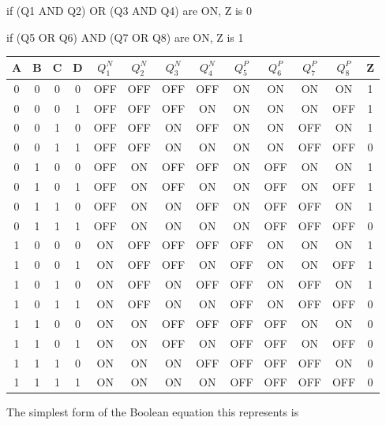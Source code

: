 \documentclass{article}
\begin{document}
\begin{center}
    if (Q1 AND Q2) OR (Q3 AND Q4) are ON, Z is 0
    
    if (Q5 OR Q6) AND (Q7 OR Q8) are ON, Z is 1
    
    \vspace{3mm}
    
    \begin{tabular}{c|c|c|c|c|c|c|c|c|c|c|c|c}
        A & B & C & D & $Q_1^N$ & $Q_2^N$ & $Q_3^N$ & $Q_4^N$ & $Q_5^P$ & $Q_6^P$ & $Q_7^P$ & $Q_8^P$ & Z\\ 
        \hline
         0 & 0 & 0 & 0 & OFF & OFF & OFF & OFF & ON  & ON  & ON  & ON  & 1\\
         0 & 0 & 0 & 1 & OFF & OFF & OFF & ON  & ON  & ON  & ON  & OFF & 1\\
         0 & 0 & 1 & 0 & OFF & OFF & ON  & OFF & ON  & ON  & OFF & ON  & 1\\
         0 & 0 & 1 & 1 & OFF & OFF & ON  & ON  & ON  & ON  & OFF & OFF & 0\\
         0 & 1 & 0 & 0 & OFF & ON  & OFF & OFF & ON  & OFF & ON  & ON  & 1\\
         0 & 1 & 0 & 1 & OFF & ON  & OFF & ON  & ON  & OFF & ON  & OFF & 1\\
         0 & 1 & 1 & 0 & OFF & ON  & ON  & OFF & ON  & OFF & OFF & ON  & 1\\
         0 & 1 & 1 & 1 & OFF & ON  & ON  & ON  & ON  & OFF & OFF & OFF & 0\\
         1 & 0 & 0 & 0 & ON  & OFF & OFF & OFF & OFF & ON  & ON  & ON  & 1\\
         1 & 0 & 0 & 1 & ON  & OFF & OFF & ON  & OFF & ON  & ON  & OFF & 1\\
         1 & 0 & 1 & 0 & ON  & OFF & ON  & OFF & OFF & ON  & OFF & ON  & 1\\
         1 & 0 & 1 & 1 & ON  & OFF & ON  & ON  & OFF & ON  & OFF & OFF & 0\\
         1 & 1 & 0 & 0 & ON  & ON  & OFF & OFF & OFF & OFF & ON  & ON  & 0\\ 
         1 & 1 & 0 & 1 & ON  & ON  & OFF & ON  & OFF & OFF & ON  & OFF & 0\\
         1 & 1 & 1 & 0 & ON  & ON  & ON  & OFF & OFF & OFF & OFF & ON  & 0\\
         1 & 1 & 1 & 1 & ON  & ON  & ON  & ON  & OFF & OFF & OFF & OFF & 0\\
    \end{tabular}
    
    \vspace{2mm}
    
    The simplest form of the Boolean equation this represents is  
\end{center}
\newpage
\end{document}
